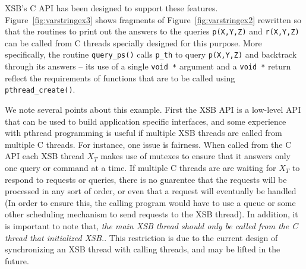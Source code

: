 XSB's C API has been designed to support these features.
Figure~\ref{fig:varstringex3} shows fragments of
Figure~\ref{fig:varstringex2} rewritten so that the routines to print
out the answers to the queries {\tt p(X,Y,Z)} and {\tt r(X,Y,Z)} can
be called from C threads specially designed for this purpose.  More
specifically, the routine {\tt query\_ps()} calls {\tt p\_th} to query
{\tt p(X,Y,Z)} and backtrack through its answers -- its use of a
single {\tt void *} argument and a {\tt void *} return reflect the
requirements of functions that are to be called using {\tt
  pthread\_create()}.

We note several points about this example.  First the XSB API is a
low-level API that can be used to build application specific
interfaces, and some experience with pthread programming is useful if
multiple XSB threads are called from multiple C threads.  For
instance, one issue is fairness.  When called from the C API each XSB
thread $X_T$ makes use of mutexes to ensure that it answers only one
query or command at a time.  If multiple C threads are are waiting for
$X_T$ to respond to requests or queries, there is no guarentee that
the requests will be processed in any sort of order, or even that a
request will eventually be handled (In order to ensure this, the
calling program would have to use a queue or some other scheduling
mechanism to send requests to the XSB thread).  In addition, it is
important to note that, {\em the main XSB thread should only be called
  from the C thread that initialized XSB.}.  This restriction is due
to the current design of synchronizing an XSB thread with calling
threads, and may be lifted in the future.

